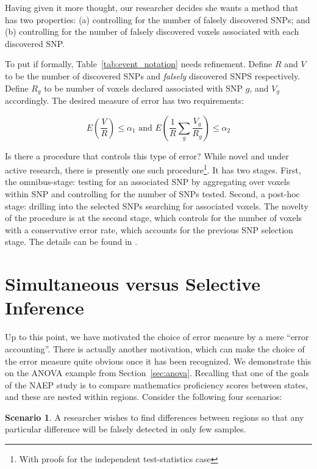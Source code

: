 \documentclass[review,12pt]{article}
\theoremstyle{definition}
\newtheorem{scenario}{Scenario}[section]
\begin{document}
Having given it more thought, our researcher decides she wants a method that has two properties: 
(a) controlling for the number of falsely discovered SNPs; and 
(b) controlling for the number of falsely discovered voxels associated with each discovered SNP. 

To put if formally, Table~\ref{tab:event_notation} needs refinement. 
Define $R$ and $V$ to be the number of discovered SNPs and \emph{falsely} discovered SNPS respectively. 
Define $R_g$ to be number of voxels declared associated with SNP $g$, and $V_g$ accordingly. The desired measure of error has two requirements: 

\begin{equation} \label{eq:hirarchial_error}
 E \left(\frac{V}{R} \right)\leq \alpha_1 
\text{ and } 
E \left( \frac{1}{R}\sum_{g} \frac{V_{g}}{R_{g}} \right)\leq \alpha_2
\end{equation}


Is there a procedure that controls this type of error? While novel and under active research, there is presently one such procedure\footnote{ With proofs for the independent test-statistics case}. It has two stages. 
First, the omnibus-stage:  testing for an associated SNP by aggregating over voxels within SNP and controlling for the number of SNPs tested. Second, a post-hoc stage: drilling into the selected SNPs searching for associated voxels. The novelty of the procedure is at the second stage, which controls for the number of voxels with a conservative error rate, which accounts for the previous SNP selection stage. 
The details can be found in \cite{benjamini_adjusting_2013}.




\section{Simultaneous versus Selective Inference}
Up to this point, we have motivated the choice of error measure by a mere ``error accounting''. 
There is actually another motivation, which can make the choice of the error measure quite obvious once it has been recognized. 
We demonstrate this on the ANOVA example from Section~\ref{sec:anova}. Recalling that one of the goals of the NAEP study is to compare mathematics proficiency scores between states, and these are nested within regions. Consider the following four scenarios:



\begin{scenario}
A researcher wishes to find differences between regions so that any particular difference will be falsely detected in only  few samples.
\label{e.g.:marginal_noSelection}
\end{scenario}
\end{document}
